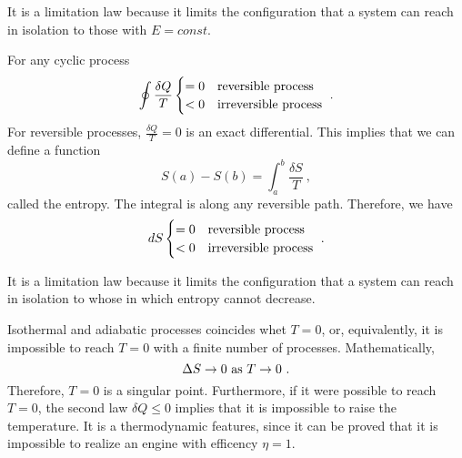     It is a limitation law because it limits the configuration that a system can reach in isolation to those with $E = const$. 

    \begin{law}[2nd]
        For any cyclic process
        \begin{equation*}
            \oint \frac{\delta Q}{T} \begin{cases}
                = 0 & \textnormal{reversible process} \\
                < 0 & \textnormal{irreversible process} \\
            \end{cases} ~.
        \end{equation*}
        For reversible processes, $\frac{\delta Q}{T} = 0$ is an exact differential. This implies that we can define a function
        \begin{equation*}
            S(a) - S(b) = \int_a^b \frac{\delta S}{T} ~,
        \end{equation*}
        called the entropy. The integral is along any reversible path. Therefore, we have  
        \begin{equation}\label{td:2nd}
            dS \begin{cases}
                = 0 & \textnormal{reversible process} \\
                < 0 & \textnormal{irreversible process} \\
            \end{cases} ~.
        \end{equation}
    \end{law}

    It is a limitation law because it limits the configuration that a system can reach in isolation to whose in which entropy cannot decrease. 

    \begin{law}[3rd]
        Isothermal and adiabatic processes coincides whet $T=0$, or, equivalently, it is impossible to reach $T=0$ with a finite number of processes. Mathematically,
        \begin{equation*}
            \Delta S \rightarrow 0 ~\textnormal{as}~ T \rightarrow 0 ~.
        \end{equation*}
        Therefore, $T=0$ is a singular point. Furthermore, if it were possible to reach $T=0$, the second law $\delta Q \leq 0$ implies that it is impossible to raise the temperature. It is a thermodynamic features, since it can be proved that it is impossible to realize an engine with efficency $\eta = 1$.
    \end{law}

